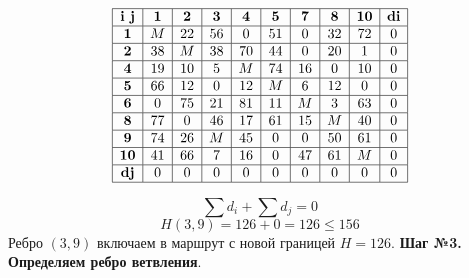 \documentclass[17pt]{extarticle}
\begin{document}
\[
    \begin{array}{|c|c|c|c|c|c|c|c|c|c|}
        \hline
        \textbf{i j} & \textbf{1} & \textbf{2} & \textbf{3} & \textbf{4} & \textbf{5} & \textbf{7} & \textbf{8} & \textbf{10} & \textbf{di} \\
        \hline
        \textbf{1}   & M          & 22         & 56         & 0          & 51         & 0          & 32         & 72          & 0           \\
        \hline
        \textbf{2}   & 38         & M          & 38         & 70         & 44         & 0          & 20         & 1           & 0           \\
        \hline
        \textbf{4}   & 19         & 10         & 5          & M          & 74         & 16         & 0          & 10          & 0           \\
        \hline
        \textbf{5}   & 66         & 12         & 0          & 12         & M          & 6          & 12         & 0           & 0           \\
        \hline
        \textbf{6}   & 0          & 75         & 21         & 81         & 11         & M          & 3          & 63          & 0           \\
        \hline
        \textbf{8}   & 77         & 0          & 46         & 17         & 61         & 15         & M          & 40          & 0           \\
        \hline
        \textbf{9}   & 74         & 26         & M          & 45         & 0          & 0          & 50         & 61          & 0           \\
        \hline
        \textbf{10}  & 41         & 66         & 7          & 16         & 0          & 47         & 61         & M           & 0           \\
        \hline
        \textbf{dj}  & 0          & 0          & 0          & 0          & 0          & 0          & 0          & 0           & 0           \\
        \hline
    \end{array}
\]

\[ \sum d_i + \sum d_j = 0 \]
\[ H(3,9) = 126 + 0 = 126 \leq 156 \]
Ребро \((3,9)\) включаем в маршрут с новой границей \( H = 126 \).
\textbf{Шаг №3.}
\textbf{Определяем ребро ветвления}.
\end{document}
